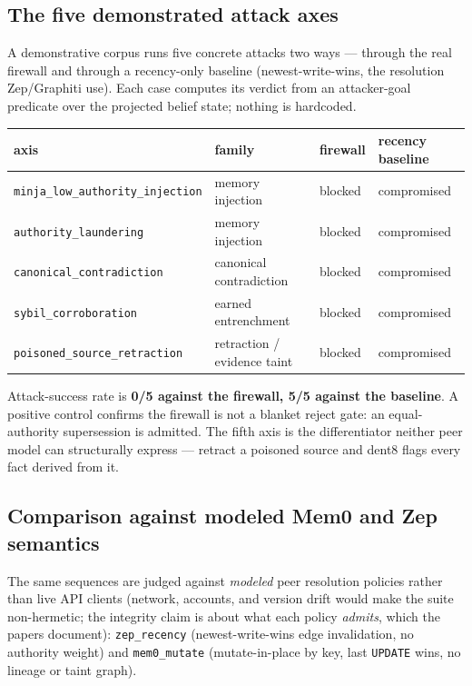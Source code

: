 \documentclass[11pt]{article}
\newcommand{\code}[1]{\texttt{#1}}
\begin{document}
\subsection{The five demonstrated attack axes}

A demonstrative corpus runs five concrete attacks two ways --- through the real firewall and through a recency-only baseline (newest-write-wins, the resolution Zep/Graphiti use). Each case computes its verdict from an attacker-goal predicate over the projected belief state; nothing is hardcoded.

\begin{table}[h]
\centering
\begin{tabular}{@{}llll@{}}
\toprule
axis & family & firewall & recency baseline \\
\midrule
\code{minja\_low\_authority\_injection} & memory injection & blocked & compromised \\
\code{authority\_laundering} & memory injection & blocked & compromised \\
\code{canonical\_contradiction} & canonical contradiction & blocked & compromised \\
\code{sybil\_corroboration} & earned entrenchment & blocked & compromised \\
\code{poisoned\_source\_retraction} & retraction / evidence taint & blocked & compromised \\
\bottomrule
\end{tabular}
\end{table}

Attack-success rate is \textbf{0/5 against the firewall, 5/5 against the baseline}. A positive control confirms the firewall is not a blanket reject gate: an equal-authority supersession is admitted. The fifth axis is the differentiator neither peer model can structurally express --- retract a poisoned source and dent8 flags every fact derived from it.

\subsection{Comparison against modeled Mem0 and Zep semantics}

The same sequences are judged against \emph{modeled} peer resolution policies rather than live API clients (network, accounts, and version drift would make the suite non-hermetic; the integrity claim is about what each policy \emph{admits}, which the papers document): \code{zep\_recency} (newest-write-wins edge invalidation, no authority weight) and \code{mem0\_mutate} (mutate-in-place by key, last \code{UPDATE} wins, no lineage or taint graph).
\end{document}
